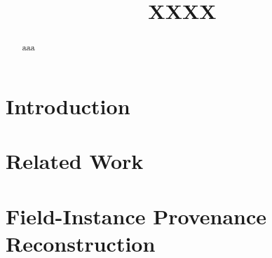 \documentclass[letterpaper,journal]{IEEEtran}
\theoremstyle{definition}
\theoremstyle{remark}
\theoremstyle{plain}
\begin{document}
\title{XXXX}

\author{

}



\maketitle

\begin{abstract}
aaa
\end{abstract}

\begin{IEEEkeywords}
\end{IEEEkeywords}

\section{Introduction}
\label{sec:intro}

\section{Related Work}
\label{sec:related_work}

\section{Field-Instance Provenance Reconstruction}
\label{sec:protocol}




\end{document}
